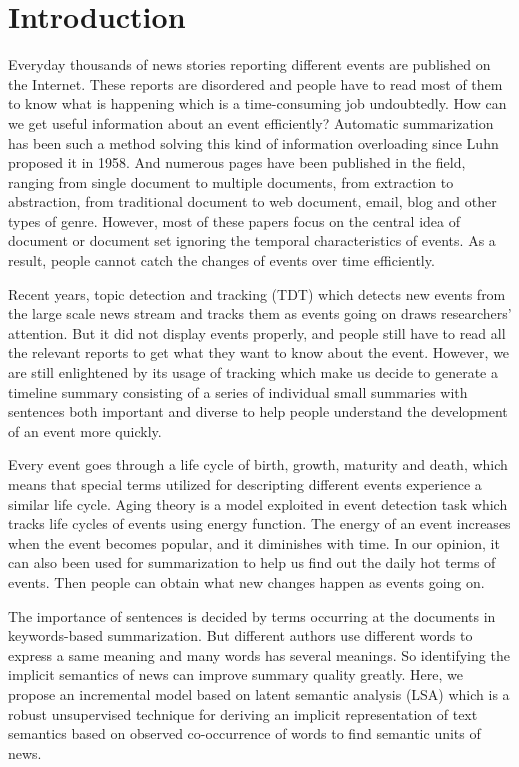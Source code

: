 \documentclass[runningheads,a4paper]{llncs}
\begin{document}
\section{Introduction}

Everyday thousands of news stories reporting different events are published on the Internet. These reports are disordered and people have to read most of them to know what is happening which is a time-consuming job undoubtedly. How can we get useful information about an event efficiently? Automatic summarization has been such a method solving this kind of information overloading since Luhn \cite{1958-Luhn-p159-165} proposed it in 1958. And numerous pages have been published in the field, ranging from single document to multiple documents, from extraction to abstraction, from traditional document to web document, email, blog and other types of genre. However, most of these papers focus on the central idea of document or document set ignoring the temporal characteristics of events. As a result, people cannot catch the changes of events over time efficiently. 

Recent years, topic detection and tracking (TDT) which detects new events from the large scale news stream and tracks them as events going on draws researchers' attention. But it did not display events properly, and people still have to read all the relevant reports to get what they want to know about the event. However, we are still enlightened by its usage of tracking which make us decide to generate a timeline summary consisting of a series of individual small summaries with sentences both important and diverse to help people understand the development of an event more quickly.

Every event goes through a life cycle of birth, growth, maturity and death, which means that special terms utilized for descripting different events experience a similar life cycle. Aging theory \cite{2003-Chen-p47-59} is a model exploited in event detection task which tracks life cycles of events using energy function. The energy of an event increases when the event becomes popular, and it diminishes with time. In our opinion, it can also been used for summarization to help us find out the daily hot terms of events. Then people can obtain what new changes happen as events going on.

The importance of sentences is decided by terms occurring at the documents in keywords-based summarization. But different authors use different words to express a same meaning and many words has several meanings. So identifying the implicit semantics of news can improve summary quality greatly. Here, we propose an incremental model based on latent semantic analysis (LSA) \cite{1990-Deerwester-p391-407} which is a robust unsupervised technique for deriving an implicit representation of text semantics based on observed co-occurrence of words to find semantic units of news.
\end{document}
